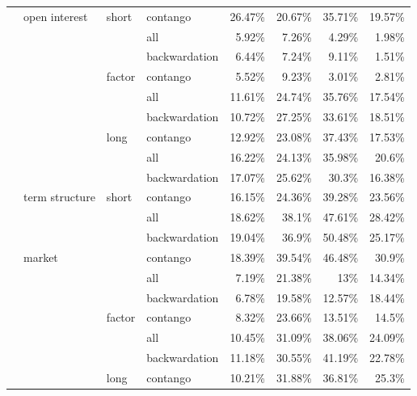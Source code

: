 \documentclass[]{elsarticle} %
\begin{document}
\begin{longtable}[t]{>{}llllrrrr}
\nopagebreak
 & \multirow[t]{-9}{*}{\raggedright\arraybackslash open interest} & \multirow[t]{-3}{*}{\raggedright\arraybackslash short} & contango & 26.47\% & 20.67\% & 35.71\% & 19.57\%\\
\nopagebreak
 &  &  & all & 5.92\% & 7.26\% & 4.29\% & 1.98\%\\
\nopagebreak
 &  &  & backwardation & 6.44\% & 7.24\% & 9.11\% & 1.51\%\\
\nopagebreak
 &  & \multirow[t]{-3}{*}{\raggedright\arraybackslash factor} & contango & 5.52\% & 9.23\% & 3.01\% & 2.81\%\\
\nopagebreak
 &  &  & all & 11.61\% & 24.74\% & 35.76\% & 17.54\%\\
\nopagebreak
 &  &  & backwardation & 10.72\% & 27.25\% & 33.61\% & 18.51\%\\
\nopagebreak
 &  & \multirow[t]{-3}{*}{\raggedright\arraybackslash long} & contango & 12.92\% & 23.08\% & 37.43\% & 17.53\%\\
\nopagebreak
 &  &  & all & 16.22\% & 24.13\% & 35.98\% & 20.6\%\\
\nopagebreak
 &  &  & backwardation & 17.07\% & 25.62\% & 30.3\% & 16.38\%\\
\nopagebreak
\multirow[t]{-30}{*}{\raggedright\arraybackslash \textbf{market}} & \multirow[t]{-9}{*}{\raggedright\arraybackslash term structure} & \multirow[t]{-3}{*}{\raggedright\arraybackslash short} & contango & 16.15\% & 24.36\% & 39.28\% & 23.56\%\\
\cmidrule{1-8}\pagebreak[0]
 &  &  & all & 18.62\% & 38.1\% & 47.61\% & 28.42\%\\
\nopagebreak
 &  &  & backwardation & 19.04\% & 36.9\% & 50.48\% & 25.17\%\\
\nopagebreak
 & \multirow[t]{-3}{*}{\raggedright\arraybackslash market} &  & contango & 18.39\% & 39.54\% & 46.48\% & 30.9\%\\
\nopagebreak
 &  &  & all & 7.19\% & 21.38\% & 13\% & 14.34\%\\
\nopagebreak
 &  &  & backwardation & 6.78\% & 19.58\% & 12.57\% & 18.44\%\\
\nopagebreak
 &  & \multirow[t]{-6}{*}{\raggedright\arraybackslash factor} & contango & 8.32\% & 23.66\% & 13.51\% & 14.5\%\\
\nopagebreak
 &  &  & all & 10.45\% & 31.09\% & 38.06\% & 24.09\%\\
\nopagebreak
 &  &  & backwardation & 11.18\% & 30.55\% & 41.19\% & 22.78\%\\
\nopagebreak
 &  & \multirow[t]{-3}{*}{\raggedright\arraybackslash long} & contango & 10.21\% & 31.88\% & 36.81\% & 25.3\%\\

\end{longtable}
\end{document}
